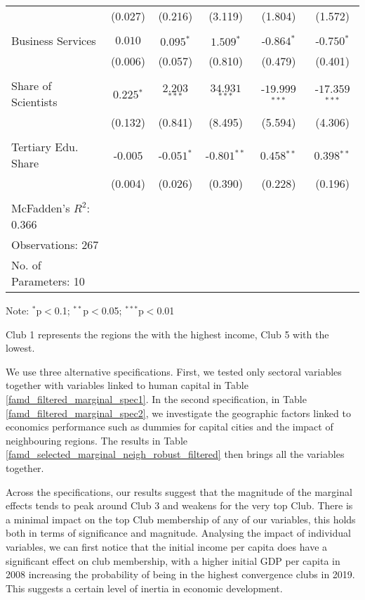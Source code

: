 \documentclass[11pt]{article}
\begin{document}
\begin{table}[!htbp]
{\begin{minipage}{\textwidth}
\begin{tabular}{@{\extracolsep{5pt}} lccccc}
& (0.027) &  (0.216) & (3.119) & (1.804) & (1.572)\\
&\\
Business Services & $0.010$ & $0.095$$^{*}$  & $1.509$$^{*}$  & $ $-$0.864$$^{*}$  & $ $-$0.750$$^{*}$  \\
& (0.006) &  (0.057) & (0.810) & (0.479) & (0.401)\\
&\\
Share of Scientists & $0.225$$^{*}$  & $2.203$$^{***}$  & $34.931$$^{***}$  & $ $-$19.999$$^{***}$  & $ $-$17.359$$^{***}$  \\ 
& (0.132) &  (0.841) & (8.495) & (5.594) & (4.306)\\
&\\
Tertiary Edu. Share & $ $-$0.005$ & $ $-$0.051$$^{*}$  & $ $-$0.801$$^{**}$  & $0.458$$^{**}$  & $0.398$$^{**}$  \\
& (0.004) &  (0.026) & (0.390) & (0.228) & (0.196)\\
\hline \hline \\[-1.8ex]
McFadden's $R^{2}$: 0.366 \\
Observations: 267\\
No. of Parameters: 10\\
\hline
\end{tabular}
\begin{tablenotes}
\small 
\item Note: $^{*}$p$<$0.1; $^{**}$p$<$0.05; $^{***}$p$<$0.01
\item Club 1 represents the regions the with the highest income, Club 5 with the lowest.
\end{tablenotes}
\end{minipage}}
\end{table} 



We use three alternative specifications. First, we tested only sectoral variables together with variables linked to human capital in Table \ref{famd_filtered_marginal_spec1}. In the second specification, in Table \ref{famd_filtered_marginal_spec2},  we investigate the geographic factors linked to economics performance such as dummies for capital cities and the impact of neighbouring regions. The results in Table \ref{famd_selected_marginal_neigh_robust_filtered} then brings all the variables together.

Across the specifications, our results suggest that the magnitude of the marginal effects tends to peak around Club 3 and weakens for the very top Club. There is a minimal impact on the top Club membership of any of our variables, this holds both in terms of significance and magnitude. 
Analysing the impact of individual variables, we can first notice that the initial income per capita does have a significant effect on club membership, with a higher initial GDP per capita in 2008 increasing the probability of being in the highest convergence clubs in 2019. This suggests a certain level of inertia in economic development.
 
\end{document}
